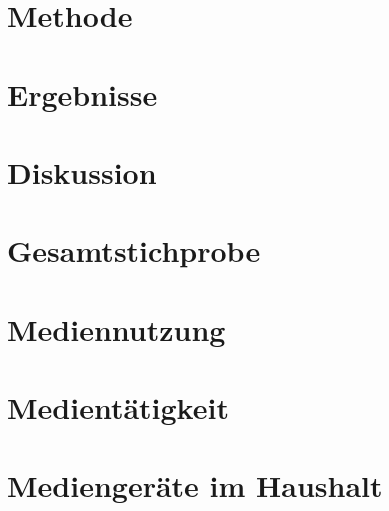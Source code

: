 \section{Methode}\label{sec:Methode}


\section{Ergebnisse}\label{sec:Ergebnisse}


\section{Diskussion}\label{sec:Diskussion}


\begin{flushleft}
\nocite{}
{}
\end{flushleft}

\newpage

\appendix 
\renewcommand{\appendixname}{Anhang}
\renewcommand\appendixtocname{Anhang}
\renewcommand{\appendixpagename}{Anhang}
\addappheadtotoc


\section{Gesamtstichprobe}\label{app:Gesamtstichprobe}

\newpage

\section{Mediennutzung}\label{app:Mediennutzung}

\newpage

\section{Medientätigkeit}\label{app:Medientätigkeit}

\newpage

\section{Mediengeräte im Haushalt}\label{app:Mediengeräte}

\newpage

